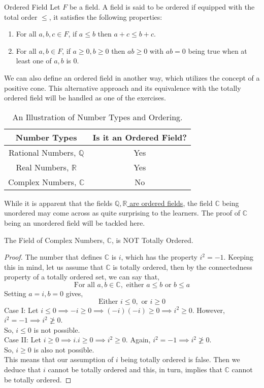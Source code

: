\begin{Definition}{Ordered Field}\label{ordered_field}
    Let $F$ be a field. A field is said to be ordered if equipped with the total order $\leq$, it satisfies the following properties:
    \begin{enumerate}
        \item For all $a,b,c\in F$, if $a\leq b$ then $a+c\leq b+c$.
        \item For all $a,b\in F$, if $a\geq0,b\geq0$ then $ab\geq0$ with $ab=0$ being true when at least one of $a,b$ is $0$.
    \end{enumerate}
\end{Definition}
\noindent We can also define an ordered field in another way, which utilizes the concept of a positive cone. This alternative approach and its equivalence with the totally ordered field will be handled as one of the exercises.
\begin{table}[H]
  \centering
  \begin{tabular}{|c|c|}
    \hline
    \textbf{Number Types} & \textbf{Is it an Ordered Field?} \\ \hline
    Rational Numbers, $\mathbb{Q}$ & Yes \\ \hline
    Real Numbers, $\mathbb{R}$ & Yes \\ \hline
    Complex Numbers, $\mathbb{C}$ & No \\ \hline
  \end{tabular}
  \caption{An Illustration of Number Types and Ordering.}
  \label{tab:order_table}
\end{table}
\noindent While it is apparent that the fields \underline{$\mathbb{Q},\mathbb{R}$ are ordered fields}, the field $\mathbb{C}$ being unordered may come across as quite surprising to the learners. The proof of $\mathbb{C}$ being an unordered field will be tackled here.
\begin{Example}\label{C_is_unordered}
    The Field of Complex Numbers, $\mathbb{C}$, is NOT Totally Ordered.
\end{Example}
\begin{proof}
    The number that defines $\mathbb{C}$ is $i$, which has the property $i^2=-1$. Keeping this in mind, let us assume that $\mathbb{C}$ is totally ordered, then by the connectedness property of a totally ordered set, we can say that,
    $$\text{For all }a,b\in\mathbb{C},\text{ either }a\leq b\text{ or }b\leq a$$
    Setting $a=i,b=0$ gives,
    $$\text{Either }i\leq0,\text{ or }i\geq0$$
    Case I: Let $i\leq0\implies-i\geq0\implies(-i)(-i)\geq0\implies i^2\geq0$. However, $i^2=-1\implies i^2\ngeq0$.\\ So, $i\leq0$ is not possible.\\
    Case II: Let $i\geq0\implies i.i\geq0\implies i^2\geq0$. Again, $i^2=-1\implies i^2\ngeq0$.\\ So, $i\geq0$ is also not possible.\\
    This means that our assumption of $i$ being totally ordered is false. Then we deduce that $i$ cannot be totally ordered and this, in turn, implies that $\mathbb{C}$ cannot be totally ordered\footnotemark.
\end{proof}

